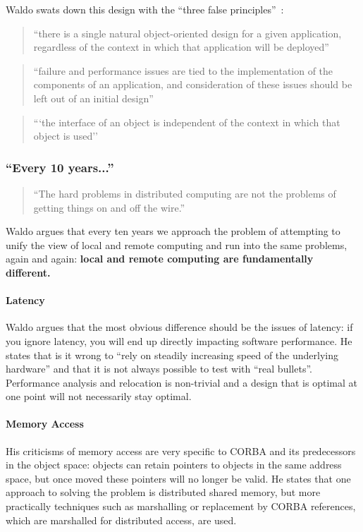 Waldo swats down this design with the ``three false principles''~\cite{kendall1994note}:

\begin{quote}
``there is a single natural object-oriented design for a given
application, regardless of the context in which that application
will be deployed''
\end{quote}

\begin{quote}
``failure and performance issues are tied to the implementation of
the components of an application, and consideration of these
issues should be left out of an initial design''
\end{quote}

\begin{quote}
```the interface of an object is independent of the context in which
that object is used''
\end{quote}

\subsubsection{``Every 10 years...''}

\begin{quote}
``The hard problems in distributed computing are not the problems of getting things on and off the wire.''~\cite{kendall1994note}
\end{quote}

Waldo argues that every ten years we approach the problem of attempting to unify the view of local and remote computing and run into the same problems, again and again: \textbf{local and remote computing are fundamentally different.}

\paragraph{Latency} Waldo argues that the most obvious difference should be the issues of latency: if you ignore latency, you will end up directly impacting software performance.  He states that is it wrong to ``rely on steadily increasing speed of the underlying hardware'' and that it is not always possible to test with ``real bullets''.  Performance analysis and relocation is non-trivial and a design that is optimal at one point will not necessarily stay optimal.

\paragraph{Memory Access} His criticisms of memory access are very specific to CORBA and its predecessors in the object space: objects can retain pointers to objects in the same address space, but once moved these pointers will no longer be valid.  He states that one approach to solving the problem is distributed shared memory, but more practically techniques such as marshalling or replacement by CORBA references, which are marshalled for distributed access, are used.

